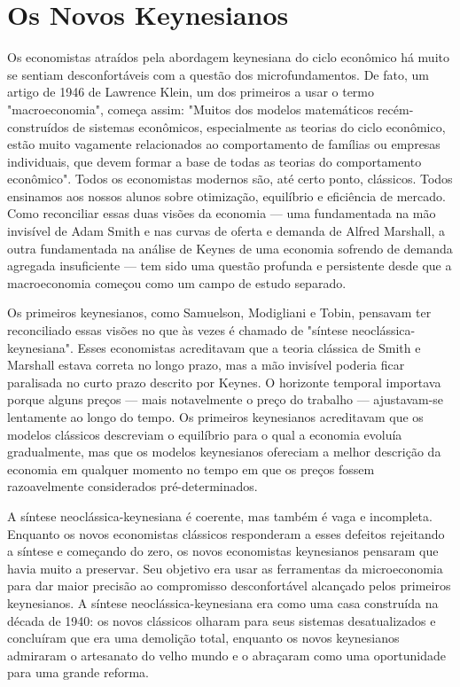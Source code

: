 \documentclass[12pt]{article}
\begin{document}
\section{Os Novos Keynesianos}

Os economistas atraídos pela abordagem keynesiana do ciclo econômico há muito se sentiam desconfortáveis com a questão dos microfundamentos. De fato, um artigo de 1946 de Lawrence Klein, um dos primeiros a usar o termo "macroeconomia", começa assim: "Muitos dos modelos matemáticos recém-construídos de sistemas econômicos, especialmente as teorias do ciclo econômico, estão muito vagamente relacionados ao comportamento de famílias ou empresas individuais, que devem formar a base de todas as teorias do comportamento econômico". Todos os economistas modernos são, até certo ponto, clássicos. Todos ensinamos aos nossos alunos sobre otimização, equilíbrio e eficiência de mercado. Como reconciliar essas duas visões da economia — uma fundamentada na mão invisível de Adam Smith e nas curvas de oferta e demanda de Alfred Marshall, a outra fundamentada na análise de Keynes de uma economia sofrendo de demanda agregada insuficiente — tem sido uma questão profunda e persistente desde que a macroeconomia começou como um campo de estudo separado.

Os primeiros keynesianos, como Samuelson, Modigliani e Tobin, pensavam ter reconciliado essas visões no que às vezes é chamado de "síntese neoclássica-keynesiana". Esses economistas acreditavam que a teoria clássica de Smith e Marshall estava correta no longo prazo, mas a mão invisível poderia ficar paralisada no curto prazo descrito por Keynes. O horizonte temporal importava porque alguns preços — mais notavelmente o preço do trabalho — ajustavam-se lentamente ao longo do tempo. Os primeiros keynesianos acreditavam que os modelos clássicos descreviam o equilíbrio para o qual a economia evoluía gradualmente, mas que os modelos keynesianos ofereciam a melhor descrição da economia em qualquer momento no tempo em que os preços fossem razoavelmente considerados pré-determinados.

A síntese neoclássica-keynesiana é coerente, mas também é vaga e incompleta. Enquanto os novos economistas clássicos responderam a esses defeitos rejeitando a síntese e começando do zero, os novos economistas keynesianos pensaram que havia muito a preservar. Seu objetivo era usar as ferramentas da microeconomia para dar maior precisão ao compromisso desconfortável alcançado pelos primeiros keynesianos. A síntese neoclássica-keynesiana era como uma casa construída na década de 1940: os novos clássicos olharam para seus sistemas desatualizados e concluíram que era uma demolição total, enquanto os novos keynesianos admiraram o artesanato do velho mundo e o abraçaram como uma oportunidade para uma grande reforma.
\end{document}
